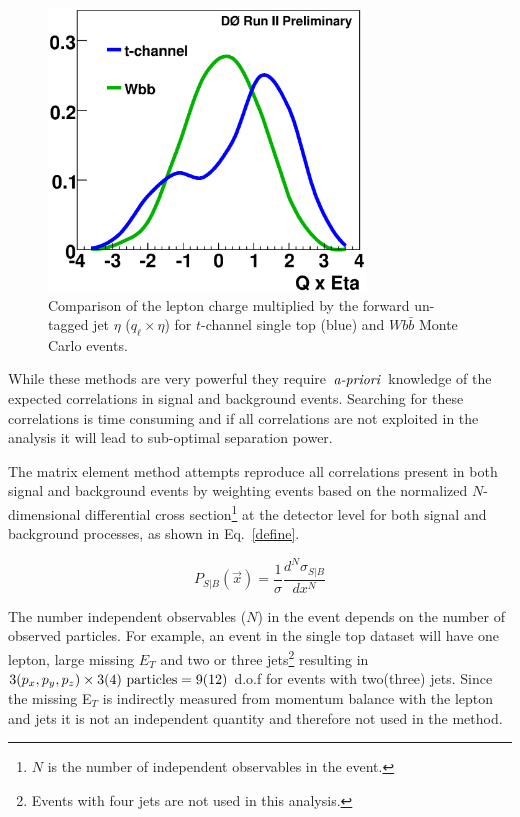 \begin{figure}[!h!tbp]
\begin{center}
\includegraphics[width=0.75\textwidth]{eps/MatrixElement/intro/qtimeseta.eps}
\vspace{-0.1in}
\caption{Comparison of the lepton charge multiplied by the forward un-tagged jet $\eta$ ($q_{\ell}\times \eta$) for $t$-channel single top (blue) and $Wb\bar{b}$ Monte Carlo events.}
\label{qtimeseta}
\end{center}
\end{figure}

While these methods are very powerful they require~$\emph{a-priori}$~knowledge of the expected correlations in signal and background events. Searching for these correlations is time consuming and if all correlations are not exploited in the analysis it will lead to sub-optimal separation power.

The matrix element method attempts reproduce all correlations present in both signal and background events by weighting events based on the normalized $N$-dimensional differential cross section\footnote{$N$ is the number of independent observables in the event.} at the detector level for both signal and background processes, as shown in Eq.~\ref{define}. 

\begin{equation}
\label{define}
P_{S|B}(\vec{x}) = \frac{1}{\sigma} \frac{d^{N}\sigma_{S|B}}{dx^{N}}
\end{equation}

The number independent observables ($N$) in the event depends on the number of observed particles. For example, an event in the single top dataset will have one lepton, large missing $E_{T}$ and two or three jets\footnote{Events with four jets are not used in this analysis.} resulting in $3 (p_{x},p_{y},p_{z}) \times 3(4)~\rm{particles}=9(12)$ d.o.f for events with two(three) jets. Since the missing E$_{T}$ is indirectly measured from momentum balance with the lepton and jets it is not an independent quantity and therefore not used in the method.

